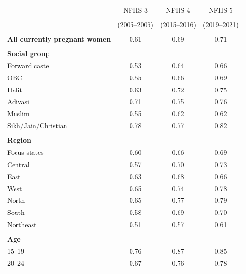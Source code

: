 \begin{tabular}{lccc}
\toprule
 & \multicolumn{1}{c}{NFHS-3} & \multicolumn{1}{c}{NFHS-4} & \multicolumn{1}{c}{NFHS-5} \\\\
 & \multicolumn{1}{c}{(2005--2006)} & \multicolumn{1}{c}{(2015--2016)} & \multicolumn{1}{c}{(2019--2021)} \\\\
\midrule
\textbf{All currently pregnant women}&0.61&0.69&0.71\\
&&&\\
\textbf{Social group}&&&\\
\hspace*{2em}Forward caste&0.53&0.64&0.66\\
\hspace*{2em}OBC&0.55&0.66&0.69\\
\hspace*{2em}Dalit&0.63&0.72&0.75\\
\hspace*{2em}Adivasi&0.71&0.75&0.76\\
\hspace*{2em}Muslim&0.55&0.62&0.62\\
\hspace*{2em}Sikh/Jain/Christian&0.78&0.77&0.82\\
&&&\\
\textbf{Region}&&&\\
\hspace*{2em}Focus states&0.60&0.66&0.69\\
\hspace*{2em}Central&0.57&0.70&0.73\\
\hspace*{2em}East&0.63&0.68&0.66\\
\hspace*{2em}West&0.65&0.74&0.78\\
\hspace*{2em}North&0.65&0.77&0.79\\
\hspace*{2em}South&0.58&0.69&0.70\\
\hspace*{2em}Northeast&0.51&0.57&0.61\\
&&&\\
\textbf{Age}&&&\\
\hspace*{2em}15--19&0.76&0.87&0.85\\
\hspace*{2em}20--24&0.67&0.76&0.78\\

\end{tabular}
